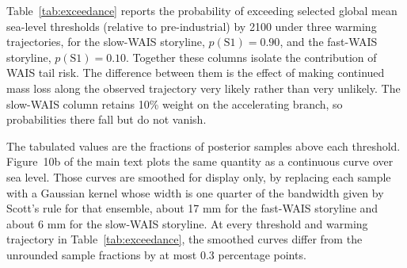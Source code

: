 \documentclass[12pt]{article}
\begin{document}
Table~\ref{tab:exceedance} reports the probability of exceeding selected global mean sea-level thresholds (relative to pre-industrial) by 2100 under three warming trajectories, for the slow-WAIS storyline, $p(\mathrm{S1}) = 0.90$, and the fast-WAIS storyline, $p(\mathrm{S1}) = 0.10$. Together these columns isolate the contribution of WAIS tail risk. The difference between them is the effect of making continued mass loss along the observed trajectory very likely rather than very unlikely. The slow-WAIS column retains 10\% weight on the accelerating branch, so probabilities there fall but do not vanish.

The tabulated values are the fractions of posterior samples above each threshold. Figure~10b of the main text plots the same quantity as a continuous curve over sea level. Those curves are smoothed for display only, by replacing each sample with a Gaussian kernel whose width is one quarter of the bandwidth given by Scott's rule for that ensemble, about 17 mm for the fast-WAIS storyline and about 6 mm for the slow-WAIS storyline. At every threshold and warming trajectory in Table~\ref{tab:exceedance}, the smoothed curves differ from the unrounded sample fractions by at most 0.3 percentage points.
\end{document}
